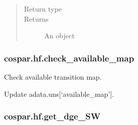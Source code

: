 \documentclass[letterpaper,10pt,english]{sphinxmanual}
\begin{document}
\begin{fulllineitems}
\begin{quote}
\begin{description}
\begin{description}
\end{description}

\item[{Return type}] \leavevmode
{}

\item[{Returns}] \leavevmode
An  object

\end{description}\end{quote}

\end{fulllineitems}



\subsubsection{cospar.hf.check\_available\_map}
\label{\detokenize{cospar.hf.check_available_map:cospar-hf-check-available-map}}\label{\detokenize{cospar.hf.check_available_map::doc}}

\begin{fulllineitems}
\label{\detokenize{cospar.hf.check_available_map:cospar.hf.check_available_map}}
Check available transition map.

Update adata.uns{[}‘available\_map’{]}.

\end{fulllineitems}



\subsubsection{cospar.hf.get\_dge\_SW}
\label{\detokenize{cospar.hf.get_dge_SW:cospar-hf-get-dge-sw}}\label{\detokenize{cospar.hf.get_dge_SW::doc}}
\end{document}
